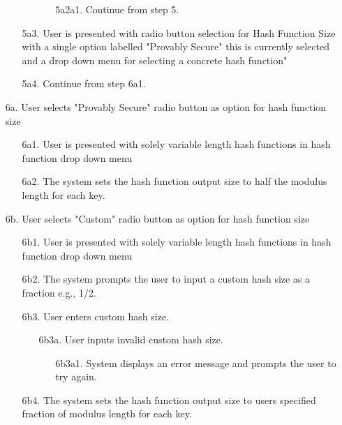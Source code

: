 \documentclass[]{final_report}
\theoremstyle{definition}
\begin{document}
\begin{enumerate}
\begin{enumerate}
\begin{enumerate}
\begin{enumerate}
        \item[5a2a1.] Continue from step 5.
            \end{enumerate}
    \end{enumerate}
    \item[5a3.]  User is presented with radio button selection for Hash Function Size with a single option labelled "Provably Secure" this is currently selected and a drop down menu for selecting a concrete hash function"
     \item[5a4.]  Continue from step 6a1.
    \end{enumerate}
       \item[6a.] User selects "Provably Secure" radio button as option for hash function size
    \begin{enumerate}
        \item[6a1.] User is presented with solely variable length hash functions in hash function drop down menu
         \item[6a2.] The system sets the hash function output size to half the modulus length for each key.
    \end{enumerate}
         \item[6b.] User selects "Custom" radio button as option for hash function size
    \begin{enumerate}
        \item[6b1.] User is presented with solely variable length hash functions in hash function drop down menu
        \item[6b2.] The system prompts the user to input a custom hash size as a fraction e.g., 1/2.
         \item[6b3.] User enters custom hash size.
             \begin{enumerate}
             \item[6b3a.] User inputs invalid custom hash size.
    \begin{enumerate}
        \item[6b3a1.] System displays an error message and prompts the user to try again.
    \end{enumerate}
        \end{enumerate}
         \item[6b4.] The system sets the hash function output size to users specified fraction of modulus length for each key.
    \end{enumerate}
   


\end{enumerate}
\end{document}
